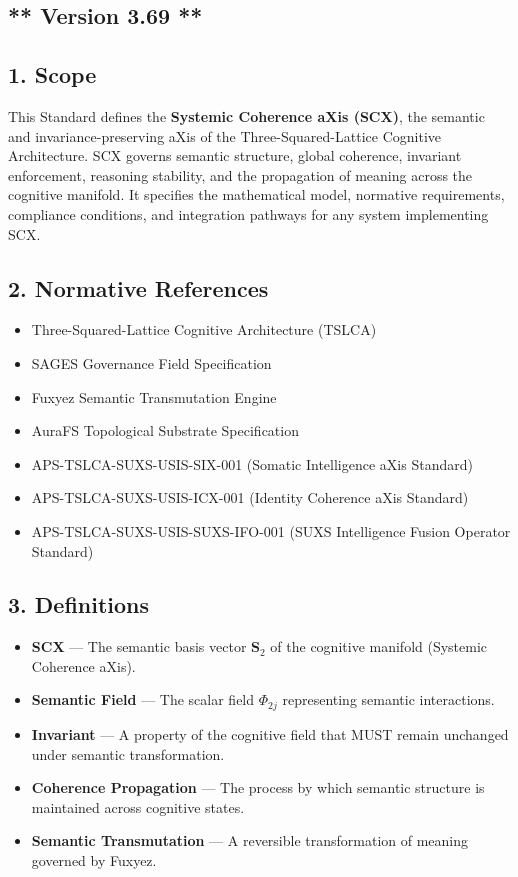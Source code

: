 \subsection{** Version 3.69 **}\label{version-3.69}

\subsection{1. Scope}\label{scope}

This Standard defines the \textbf{Systemic Coherence aXis (SCX)}, the semantic and invariance-preserving aXis of the Three-Squared-Lattice Cognitive Architecture. SCX governs semantic structure, global coherence, invariant enforcement, reasoning stability, and the propagation of meaning across the cognitive manifold. It specifies the mathematical model, normative requirements, compliance conditions, and integration pathways for any system implementing SCX.

\subsection{2. Normative References}\label{normative-references}

\begin{itemize}
\tightlist
\item
  Three-Squared-Lattice Cognitive Architecture (TSLCA)
\item
  SAGES Governance Field Specification
\item
  Fuxyez Semantic Transmutation Engine
\item
  AuraFS Topological Substrate Specification
\item
  APS-TSLCA-SUXS-USIS-SIX-001 (Somatic Intelligence aXis Standard)
\item
  APS-TSLCA-SUXS-USIS-ICX-001 (Identity Coherence aXis Standard)
\item
  APS-TSLCA-SUXS-USIS-SUXS-IFO-001 (SUXS Intelligence Fusion Operator Standard)
\end{itemize}

\subsection{3. Definitions}\label{definitions}

\begin{itemize}
\tightlist
\item
  \textbf{SCX} --- The semantic basis vector \(\mathbf{S}_2\) of the cognitive manifold (Systemic Coherence aXis).
\item
  \textbf{Semantic Field} --- The scalar field \(\Phi_{2j}\) representing semantic interactions.
\item
  \textbf{Invariant} --- A property of the cognitive field that MUST remain unchanged under semantic transformation.
\item
  \textbf{Coherence Propagation} --- The process by which semantic structure is maintained across cognitive states.
\item
  \textbf{Semantic Transmutation} --- A reversible transformation of meaning governed by Fuxyez.
\end{itemize}

